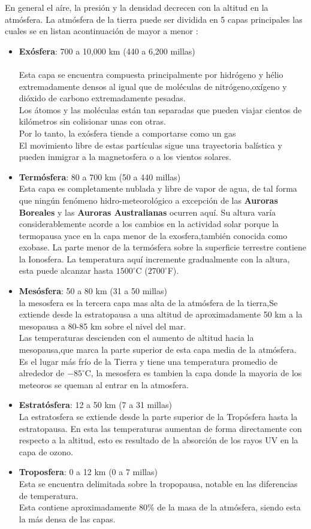 \documentclass{article}
\begin{document}
En general el aíre, la presión y la densidad decrecen con la altitud en la atmósfera.
La atmósfera de la tierra puede ser dividida en 5 capas principales las cuales se en listan  acontinuación de mayor a menor :
\begin{itemize}
\item \textbf{Exósfera}: 700 a 10,000 km (440 a 6,200 millas) \\
\\Esta capa se encuentra compuesta principalmente por hidrógeno y hélio extremadamente densos al igual que de moléculas de nitrógeno,oxígeno y dióxido de carbono extremadamente pesadas.\\
Los átomos y las moléculas están tan separadas que pueden viajar cientos de kilómetros sin colisionar unas con otras. \\
Por lo tanto, la exósfera tiende a comportarse como un gas \\ El movimiento libre de estas partículas sigue una trayectoria balística y pueden inmigrar a la magnetosfera o a los vientos solares.
\item \textbf{Termósfera}: 80 a 700 km (50 a 440 millas)
\\Esta capa es completamente nublada y libre de vapor de agua, de tal forma que ningún fenómeno hidro-meteorológico a excepción de las \textbf{Auroras Boreales} y las \textbf{Auroras Australianas} ocurren aquí.
Su altura varía considerablemente acorde a los cambios en la actividad solar porque la termopausa yace en la capa menor de la exosfera,también conocida como exobase.
La parte menor de la termósfera sobre la superficie terrestre contiene la Ionosfera.
La temperatura aquí incremente gradualmente con la altura, esta puede alcanzar hasta $1500^{\circ}$C ($2700^{\circ}$F).
\item \textbf{Mesósfera}: 50 a 80 km (31 a 50 millas)\\
la mesosfera es la tercera capa mas alta de la atmósfera de la tierra,Se extiende desde la estratopausa a una altitud de aproximadamente 50 km a la mesopausa a 80-85 km sobre el nivel del mar.\\
Las temperaturas descienden con el aumento de altitud hacia la mesopausa,que marca la parte superior de esta capa media de la atmósfera. \\
Es el lugar más frío de la Tierra y tiene una temperatura promedio de alrededor de $-85^\circ$C,
la mesosfera es tambien la capa donde la mayoria de los meteoros se queman al entrar en la atmosfera.
\item \textbf{Estratósfera}: 12 a 50 km (7 a 31 millas)\\
La estratosfera se extiende desde la parte superior de la Tropósfera hasta la estratopausa.
En esta las temperaturas aumentan de forma directamente con respecto a la altitud, esto es resultado de la absorción de los rayos UV en la capa de ozono.
\item \textbf{Troposfera}: 0 a 12 km (0 a 7 millas)\\
Esta se encuentra delimitada sobre la tropopausa, notable en las diferencias de temperatura.\\
Esta contiene aproximadamente 80\% de la masa de la atmósfera, siendo esta la más densa de las capas.
\end{itemize}
\end{document}
